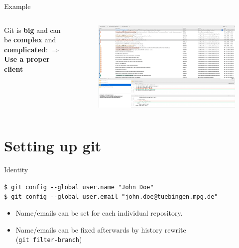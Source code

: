 \documentclass[compress,english,aspectratio=1610]{beamer}
\let\olditem\item
\renewcommand{\item}{\setlength{\itemsep}{\fill}\olditem}
\begin{document}
\begin{frame}{Example}
	\begin{columns}
        Git is \textbf{big} and can be \textbf{complex} and \textbf{complicated}:\newline
        $\Longrightarrow$ \textbf{Use a proper client}
		\begin{figure}
     		\includegraphics[width=\textwidth]{figures/git-general}
    		\end{figure}
	\end{columns}
\end{frame}



\section{Setting up git}

\begin{frame}{Identity}

	\begin{tcolorbox}[colback=mpg-gray,colframe=mpg-green,title=Global settings]
	  {\tt \$ git config -{}-global user.name "John Doe"}\\
	  {\tt \$ git config -{}-global user.email "john.doe@tuebingen.mpg.de"}
	\end{tcolorbox}
	\begin{tcolorbox}[colback=mpg-gray,colframe=mpg-green,title=Note]
		\begin{itemize}
			\item Name/emails can be set for each individual repository.
			\item Name/emails can be fixed afterwards by history rewrite\\ ({\tt git filter-branch})
		\end{itemize}
	\end{tcolorbox}
\end{frame}
\end{document}
